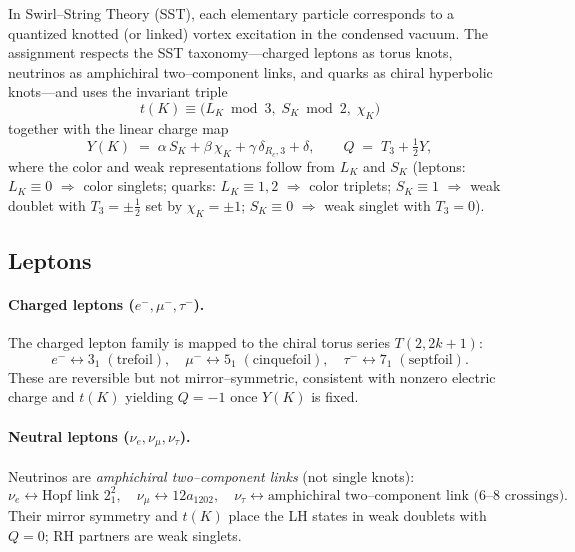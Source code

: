 \documentclass[smallextended]{svjour3}       %
\begin{document}
    In Swirl–String Theory (SST), each elementary particle corresponds to a quantized knotted (or linked) vortex excitation in the condensed vacuum. The assignment respects the SST taxonomy—charged leptons as torus knots, neutrinos as amphichiral two–component links, and quarks as chiral hyperbolic knots—and uses the invariant triple
    \[
        t(K) \equiv \big(L_K \bmod 3,\; S_K \bmod 2,\; \chi_K\big)
    \]
    together with the linear charge map
    \[
        Y(K) \;=\; \alpha\,S_K + \beta\,\chi_K + \gamma\,\delta_{R_c,3} + \delta,\qquad
        Q \;=\; T_3 + \tfrac12 Y,
    \]
    where the color and weak representations follow from $L_K$ and $S_K$ (leptons: $L_K\!\equiv\!0$ $\Rightarrow$ color singlets; quarks: $L_K\!\equiv\!1,2$ $\Rightarrow$ color triplets; $S_K\!\equiv\!1$ $\Rightarrow$ weak doublet with $T_3=\pm\tfrac12$ set by $\chi_K=\pm1$; $S_K\!\equiv\!0$ $\Rightarrow$ weak singlet with $T_3=0$).

    \subsection{Leptons}

        \paragraph{Charged leptons ($e^-,\mu^-,\tau^-$).}
            The charged lepton family is mapped to the chiral torus series $T(2,2k{+}1)$:
            \[
                e^- \leftrightarrow 3_1 \;(\text{trefoil}),\quad
                \mu^- \leftrightarrow 5_1 \;(\text{cinquefoil}),\quad
                \tau^- \leftrightarrow 7_1 \;(\text{septfoil}).
            \]
            These are reversible but not mirror–symmetric, consistent with nonzero electric charge and $t(K)$ yielding $Q=-1$ once $Y(K)$ is fixed.

        \paragraph{Neutral leptons ($\nu_e,\nu_\mu,\nu_\tau$).}
            Neutrinos are \emph{amphichiral two–component links} (not single knots):
            \[
                \nu_e \leftrightarrow \text{Hopf link } 2^2_{1},\quad
                \nu_\mu \leftrightarrow 12a_{1202},\quad
                \nu_\tau \leftrightarrow \text{amphichiral two–component link (6--8 crossings).}
            \]
            Their mirror symmetry and $t(K)$ place the LH states in weak doublets with $Q=0$; RH partners are weak singlets.
\end{document}
